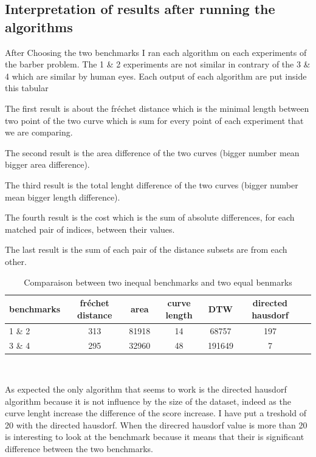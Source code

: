 \documentclass{article}
\begin{document}
\subsection{Interpretation of results after running the algorithms}

After Choosing the two benchmarks I ran each algorithm on each experiments of the barber problem.
The 1 \& 2 experiments are not similar in contrary of the 3 \& 4 which are similar by human eyes.
Each output of each algorithm are put inside this tabular

The first result is about the fréchet distance which is the minimal length  between two point of the two curve which is sum  for every point of each experiment that we are comparing.

The second result is the area difference of the two curves (bigger number mean bigger area difference).

The third result is the total lenght difference of the two curves (bigger number mean bigger length difference).

The fourth result is the cost which is the sum of absolute differences, for each matched pair of indices, between their values.

The last result is the sum of each pair of the distance subsets are from each other.

\begin{table}[h!]
\begin{tabular}{|l|c|c|c|c|c|c|}
   \hline
   benchmarks & fréchet distance & area & curve length & DTW & directed hausdorf \\
   \hline
   1 \&  2 & 313 & 81918 & 14 & 68757 & 197\\
   \hline
   3 \& 4  & 295 & 32960 & 48 & 191649 & 7 \\
   \hline
\end{tabular} \\ 
\caption{Comparaison between two inequal benchmarks and two equal benmarks}
\end{table}


As expected the only algorithm that seems to work is the directed hausdorf algorithm because it is not influence by the size of the dataset, indeed as the curve lenght increase the difference of the score increase. 
I have put a treshold of 20 with the directed hausdorf. When the direcred hausdorf value is more than 20 is interesting to look at the benchmark because it means that their is significant difference between the two benchmarks.
\end{document}
